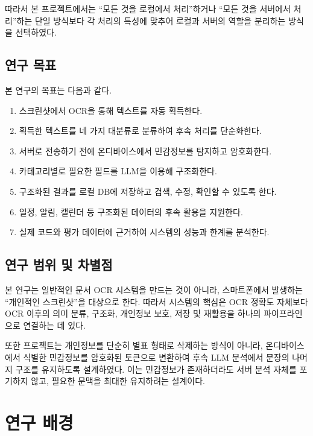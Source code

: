 \documentclass[11pt,a4paper]{article}
\begin{document}
따라서 본 프로젝트에서는 ``모든 것을 로컬에서 처리''하거나 ``모든 것을 서버에서 처리''하는 단일 방식보다 각 처리의 특성에 맞추어 로컬과 서버의 역할을 분리하는 방식을 선택하였다.

\subsection{연구 목표}

본 연구의 목표는 다음과 같다.

\begin{enumerate}[label=\arabic*)]
    \item 스크린샷에서 OCR을 통해 텍스트를 자동 획득한다.
    \item 획득한 텍스트를 네 가지 대분류로 분류하여 후속 처리를 단순화한다.
    \item 서버로 전송하기 전에 온디바이스에서 민감정보를 탐지하고 암호화한다.
    \item 카테고리별로 필요한 필드를 LLM을 이용해 구조화한다.
    \item 구조화된 결과를 로컬 DB에 저장하고 검색, 수정, 확인할 수 있도록 한다.
    \item 일정, 알림, 캘린더 등 구조화된 데이터의 후속 활용을 지원한다.
    \item 실제 코드와 평가 데이터에 근거하여 시스템의 성능과 한계를 분석한다.
\end{enumerate}

\subsection{연구 범위 및 차별점}

본 연구는 일반적인 문서 OCR 시스템을 만드는 것이 아니라, 스마트폰에서 발생하는 ``개인적인 스크린샷''을 대상으로 한다. 따라서 시스템의 핵심은 OCR 정확도 자체보다 OCR 이후의 의미 분류, 구조화, 개인정보 보호, 저장 및 재활용을 하나의 파이프라인으로 연결하는 데 있다.

또한 프로젝트는 개인정보를 단순히 별표 형태로 삭제하는 방식이 아니라, 온디바이스에서 식별한 민감정보를 암호화된 토큰으로 변환하여 후속 LLM 분석에서 문장의 나머지 구조를 유지하도록 설계하였다. 이는 민감정보가 존재하더라도 서버 분석 자체를 포기하지 않고, 필요한 문맥을 최대한 유지하려는 설계이다.

\newpage

\section{연구 배경}
\end{document}
